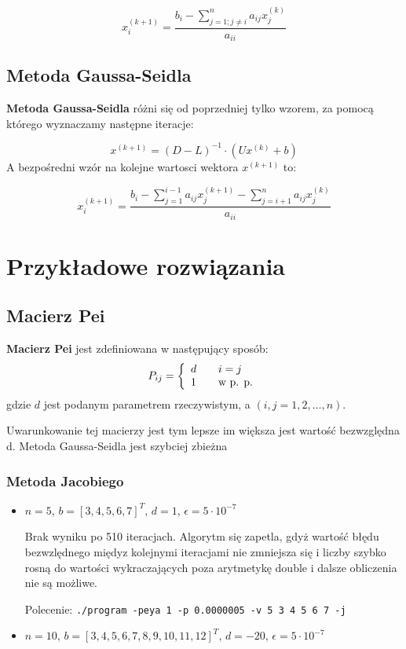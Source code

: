 \documentclass[a4paper,11pt]{article}
\begin{document}
  $$ x^{(k+1)}_i = \frac {b_i - \sum_{j=1; j \neq i }^n a_{ij} x^{(k)}_j} { a_{ii} } $$
  
\subsection{Metoda Gaussa-Seidla}
  \textbf{Metoda Gaussa-Seidla} różni się od poprzedniej tylko wzorem, za 
  pomocą którego wyznaczamy następne iteracje:
  
  $$ x^{(k+1)} = (D -L)^{-1} \cdot (Ux^{(k)} + b) $$
  A bezpośredni wzór na kolejne wartosci wektora $x^{(k+1)}$ to:
  
  $$ x^{(k+1)}_i = \frac {b_i - \sum_{j = 1}^{i-1} a_{ij} x^{(k+1)}_j - \sum_{j=i+1}^n a_{ij} x^{(k)}_j} { a_{ii} } $$

\section{Przykładowe rozwiązania}
\subsection{Macierz Pei}
  \textbf{Macierz Pei} jest zdefiniowana w następujący sposób:
    $$
        P_{ij} = \left\{\begin{array}{l l}
            d & \quad i = j \\
            1 & \quad \textrm{w p. p.}
        \end{array}\right.
    $$
    gdzie $d$ jest podanym parametrem rzeczywistym, a $ (i, j = 1, 2, \dots, n) $. 
    
    Uwarunkowanie tej macierzy jest tym lepsze im większa jest wartość bezwzględna d. Metoda Gaussa-Seidla jest szybciej zbieżna
\subsubsection{Metoda Jacobiego}
  \begin{itemize}
    \item $ n = 5 $, $ b = [3, 4, 5, 6, 7]^T$, $ d = 1 $, $ \epsilon = 5 \cdot 10^{-7} $
    
    Brak wyniku po 510 iteracjach. Algorytm się zapetla, gdyż wartość błędu bezwzlędnego międyz 
    kolejnymi iteracjami nie zmniejsza się i liczby szybko rosną do wartości wykraczających poza 
    arytmetykę double i dalsze obliczenia nie są możliwe.
    
    Polecenie: \texttt{./program -peya 1 -p 0.0000005 -v 5 3 4 5 6 7 -j}
    
    \item $ n = 10 $, $ b = [3, 4, 5, 6, 7, 8, 9, 10, 11, 12]^T$, $ d = -20 $, $ \epsilon = 5 \cdot 10^{-7} $
  \end{itemize}
\end{document}
